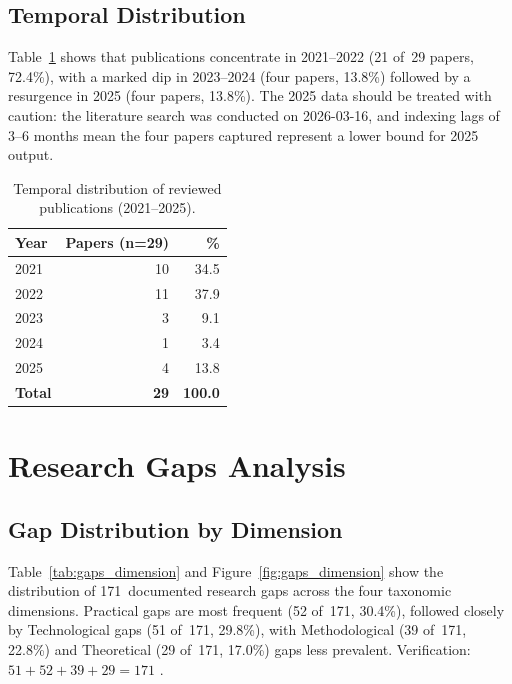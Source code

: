\documentclass[review,3p]{elsarticle}
\begin{document}
\subsection{Temporal Distribution}
\label{subsec:temporal}

Table~\ref{tab:temporal} shows that publications concentrate in 2021--2022
(21 of~29 papers, 72.4\%), with a marked dip in 2023--2024 (four papers, 13.8\%)
followed by a resurgence in 2025 (four papers, 13.8\%). The 2025 data should be
treated with caution: the literature search was conducted on 2026-03-16, and
indexing lags of 3--6 months mean the four papers captured represent a lower
bound for 2025 output.

\begin{table}[htbp]
\centering
\caption{Temporal distribution of reviewed publications (2021--2025).}
\label{tab:temporal}
\begin{tabular}{lrr}
\toprule
\textbf{Year} & \textbf{Papers (n=29)} & \textbf{\%} \\
\midrule
2021 & 10 & 34.5 \\
2022 & 11 & 37.9 \\
2023 &  3 &  9.1 \\  %
2024 &  1 &  3.4 \\
2025 &  4 & 13.8 \\  %
\midrule
\textbf{Total} & \textbf{29} & \textbf{100.0} \\
\bottomrule
\end{tabular}
\end{table}

\section{Research Gaps Analysis}

\subsection{Gap Distribution by Dimension}
\label{subsec:gap_dimension}

Table~\ref{tab:gaps_dimension} and Figure~\ref{fig:gaps_dimension} show the
distribution of 171~documented research gaps across the four taxonomic
dimensions. Practical gaps are most frequent (52 of~171, 30.4\%), followed
closely by Technological gaps (51 of~171, 29.8\%), with Methodological
(39 of~171, 22.8\%) and Theoretical (29 of~171, 17.0\%) gaps less prevalent.
Verification: $51+52+39+29=171$ \checkmark.
\end{document}
